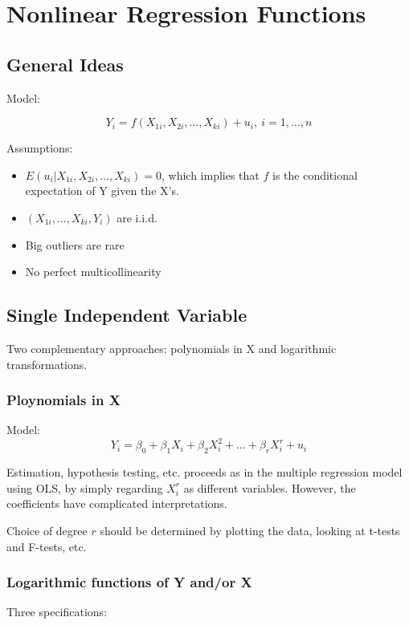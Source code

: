 \documentclass{article}
\begin{document}
\section{Nonlinear Regression Functions}

\subsection{General Ideas}

Model:

\[
	Y_i = f \left( X_{1i}, X_{2i}, \ldots, X_{ki} \right) + u_i,\ i=1, \ldots, n
\]

Assumptions:
\begin{itemize}
	\item $E(u_i|X_{1i}, X_{2i}, \ldots, X_{ki}) = 0$, which implies that $f$ is the conditional expectation of Y given the X's.
	\item $(X_{1i}, \ldots, X_{ki}, Y_i)$ are i.i.d.
	\item Big outliers are rare
	\item No perfect multicollinearity
\end{itemize}

\subsection{Single Independent Variable}

Two complementary approaches: polynomials in X and logarithmic transformations.

\subsubsection{Ploynomials in X}

Model:
\[
	Y_i = \beta_0 + \beta_1 X_i + \beta_2 X_i^2 + \ldots + \beta_r X_i^r + u_i
\]

Estimation, hypothesis testing, etc. proceeds as in the multiple regression model using OLS,
by simply regarding $X_i^r$ as different variables.
However, the coefficients have complicated interpretations.

Choice of degree $r$ should be determined by plotting the data,
looking at t-tests and F-tests, etc.

\subsubsection{Logarithmic functions of Y and/or X}

Three specifications:
\end{document}
